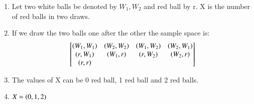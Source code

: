 \renewcommand{\theequation}{\theenumi}
\begin{enumerate}

\item Let two white balls be denoted by $W_{1}, W_{2}$ and red ball by r. X is the number of red balls in two draws.

\item If we draw the two balls one after the other the sample space is:
\begin{align}
\begin{bmatrix}
\left(W_{1}, W_{1}\right) & \left(W_{2}, W_{2}\right) & \left(W_{1}, W_{2}\right) & \left(W_{2}, W_{1}\right) \\ 
\left(r, W_{1}\right) & \left(W_{1}, r\right) & \left(r, W_{2}\right) & \left(W_{2}, r\right) \\
\left(r, r\right)
\end{bmatrix}
\end{align}

\item The values of X can be 0 red ball, 1 red ball and 2 red balls.

\item $X = \left(0, 1, 2\right)$ 

\end{enumerate}